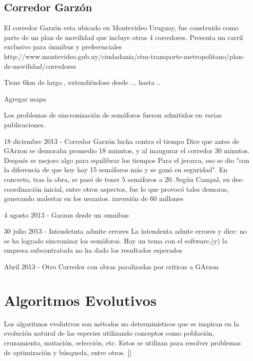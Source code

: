\subsection{Corredor Garzón}
El corredor Garzón esta ubicado en Montevideo Uruguay, fue construido como parte de un plan de movilidad que incluye otros 4 corredores. 
Presenta un carril exclusivo para ómnibus y preferenciales
http://www.montevideo.gub.uy/ciudadania/stm-transporte-metropolitano/plan-de-movilidad/corredores

Tiene 6km de largo , extendiéndose desde ...  hasta ..

Agregar mapa

Los problemas de sincronización de semáforos fueron admitidos en varias publicaciones.

18 diciembre 2013 - Corredor Garzón lucha contra el tiempo %
Dice que antes de GArzon se demoraba promedio 18 minutos, y al inaugurar el corredor 30 minutos. Después se mejoro algo para equilibrar los tiempos
Para el jerarca, eso se dio "con la diferencia de que hoy hay 15 semáforos más y se ganó en seguridad". En concreto, tras la obra, se pasó de tener 5 semáforos a 20. Según Campal, su des-coordinación inicial, entre otros aspectos, fue lo que provocó tales demoras, generando malestar en los usuarios.
inversión de 60 millones


4 agosto 2013 - Garzon desde un omnibus %


30 julio 2013  - Intendetnta admite errores %
La intendenta admte errores y dice: no se ha logrado sincronizar los semáforos. Hay un tema con el software,(y) la empresa subcontratada no ha dado los resultados esperados


Abril 2013 - Otro Corredor con obras paralizadas por criticas a GArzon





\section{Algoritmos Evolutivos}
Los algoritmos evolutivos son métodos no determinísticos que se inspiran en la evolución natural de las especies utilizando conceptos como población, cruzamiento, mutación, selección, etc. Estos se utilizan para resolver problemas de optimización y búsqueda, entre otros. []

